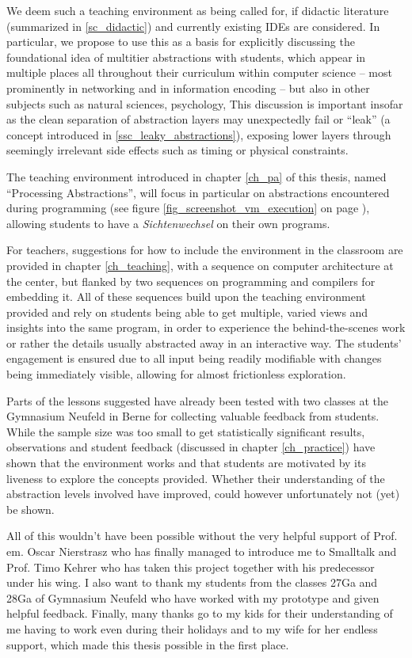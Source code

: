 We deem such a teaching environment as being called for, if didactic literature (summarized in \ref{sc_didactic}) and currently existing \acp{IDE} are considered. In particular, we propose to use this as a basis for explicitly discussing the foundational idea of multitier abstractions with students, which appear in multiple places all throughout their curriculum within computer science -- most prominently in networking and in information encoding -- but also in other subjects such as natural sciences, psychology, \etc This discussion is important insofar as the clean separation of abstraction layers may unexpectedly fail or ``leak'' (a concept introduced in \ref{ssc_leaky_abstractions}), exposing lower layers through seemingly irrelevant side effects such as timing or physical constraints.

The teaching environment introduced in chapter \ref{ch_pa} of this thesis, named ``Processing Abstractions'', will focus in particular on abstractions encountered during programming (see \eg figure \ref{fig_screenshot_vm_execution} on page \pageref{fig_screenshot_vm_execution}), allowing students to have a \emph{Sichtenwechsel} on their own programs.

For teachers, suggestions for how to include the environment in the classroom are provided in chapter \ref{ch_teaching}, with a sequence on computer architecture at the center, but flanked by two sequences on programming and compilers for embedding it. All of these sequences build upon the teaching environment provided and rely on students being able to get multiple, varied views and insights into the same program, in order to experience the behind-the-scenes work or rather the details usually abstracted away in an interactive way. The students' engagement is ensured due to all input being readily modifiable with changes being immediately visible, allowing for almost frictionless exploration.

Parts of the lessons suggested have already been tested with two classes at the Gymnasium Neufeld in Berne for collecting valuable feedback from students. While the sample size was too small to get statistically significant results, observations and student feedback (discussed in chapter \ref{ch_practice}) have shown that the environment works and that students are motivated by its liveness to explore the concepts provided. Whether their understanding of the abstraction levels involved have improved, could however unfortunately not (yet) be shown.

All of this wouldn't have been possible without the very helpful support of Prof.\,em. Oscar Nierstrasz who has finally managed to introduce me to Smalltalk and Prof. Timo Kehrer who has taken this project together with his predecessor under his wing. I also want to thank my students from the classes 27Ga and 28Ga of Gymnasium Neufeld who have worked with my prototype and given helpful feedback. Finally, many thanks go to my kids for their understanding of me having to work even during their holidays and to my wife for her endless support, which made this thesis possible in the first place.
